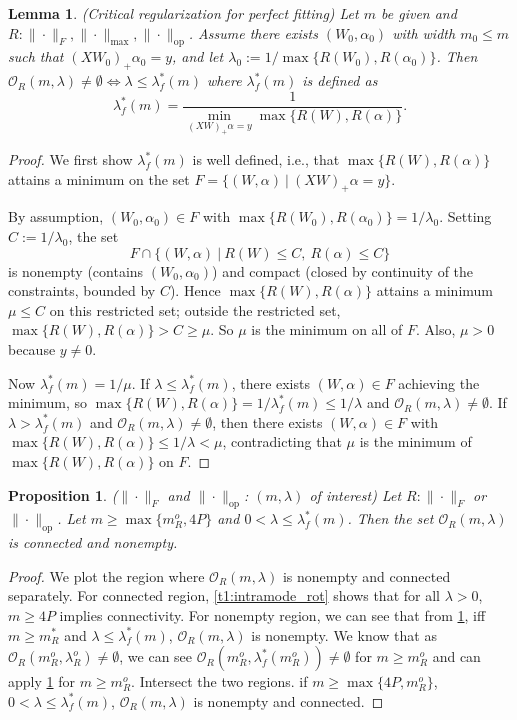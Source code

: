 \documentclass{article}
\newtheorem{lemma}{Lemma}[section]
\newtheorem{proposition}{Proposition}[section]
\newcommand{\op}{\mathrm{op}}
\begin{document}
\begin{lemma}
\label{Appxlem2: regcrit_fit}
(Critical regularization for perfect fitting) Let $m$ be given and $R: \|\cdot\|_F, \|\cdot\|_{\max}, \|\cdot\|_{\op}$. Assume there exists $(W_0, \alpha_0)$ with width $m_0 \le m$ such that $(XW_0)_+\alpha_0 = y$, and let $\lambda_0 := 1/\max\{R(W_0), R(\alpha_0)\}$. Then $\mathcal{O}_R(m, \lambda) \neq \emptyset \iff \lambda \leq \lambda_f^*(m)$ where $\lambda_f^*(m)$ is defined as 
\[
\lambda_f^{*}(m) = \frac{1}{\min_{(XW)_{+}\alpha=y} \max\{R(W), R(\alpha)\}}.
\]
\end{lemma}
\begin{proof}
We first show $\lambda^{*}_f(m)$ is well defined, i.e., that $\max\{R(W), R(\alpha)\}$ attains a minimum on the set $F = \{(W,\alpha)\ | \ (XW)_{+}\alpha=y\}$.

By assumption, $(W_0, \alpha_0) \in F$ with $\max\{R(W_0), R(\alpha_0)\} = 1/\lambda_0$. Setting $C := 1/\lambda_0$, the set
\[
F \cap \{(W,\alpha) \ | \ R(W) \leq C, \ R(\alpha) \leq C\}
\]
is nonempty (contains $(W_0, \alpha_0)$) and compact (closed by continuity of the constraints, bounded by $C$). Hence $\max\{R(W), R(\alpha)\}$ attains a minimum $\mu \leq C$ on this restricted set; outside the restricted set, $\max\{R(W), R(\alpha)\} > C \geq \mu$. So $\mu$ is the minimum on all of $F$. Also, $\mu > 0$ because $y \neq 0$.

Now $\lambda^{*}_f(m) = 1/\mu$. If $\lambda \leq \lambda_f^{*}(m)$, there exists $(W, \alpha) \in F$ achieving the minimum, so $\max\{R(W), R(\alpha)\} = 1/\lambda^{*}_f(m) \leq 1/\lambda$ and $\mathcal{O}_R(m,\lambda) \neq \emptyset$. If $\lambda > \lambda_f^{*}(m)$ and $\mathcal{O}_R(m, \lambda) \neq \emptyset$, then there exists $(W,\alpha) \in F$ with $\max\{R(W), R(\alpha)\} \leq 1/\lambda < \mu$, contradicting that $\mu$ is the minimum of $\max\{R(W), R(\alpha)\}$ on $F$.
\end{proof}

\begin{proposition}
\label{appxprop7:regime_FOP}
($\|\cdot\|_F$ and $\|\cdot\|_{\op}$: $(m, \lambda)$ of interest) Let $R: \|\cdot\|_F$ or $\|\cdot\|_{\op}$. Let $m \geq \max\{m_R^{o}, 4P\}$ and $0 <\lambda \leq \lambda_f^*(m)$. Then the set $\mathcal{O}_R(m, \lambda)$ is connected and nonempty.
\end{proposition}
\begin{proof}
We plot the region where $\mathcal{O}_R(m, \lambda)$ is nonempty and connected separately.
For connected region, \cref{t1:intramode_rot} shows that for all $\lambda > 0$, $m \geq 4P$ implies connectivity.
For nonempty region, we can see that from \cref{Appxlem2: regcrit_fit}, iff $m \geq m_R^*$ and $\lambda \leq \lambda_f^*(m)$, $\mathcal{O}_R(m, \lambda)$ is nonempty. We know that as $\mathcal{O}_R(m_R^o, \lambda_R^o) \neq \emptyset$, we can see $\mathcal{O}_R(m_R^o, \lambda_f^*(m_R^o)) \neq \emptyset$ for $m \geq m_R^o$ and can apply \cref{Appxlem2: regcrit_fit} for $m \geq m_R^o$.
Intersect the two regions. if $m \geq \max\{4P, m_R^o\}$, $0 < \lambda \leq \lambda_f^*(m)$, $\mathcal{O}_R(m, \lambda)$ is nonempty and connected.
\end{proof}
\end{document}
